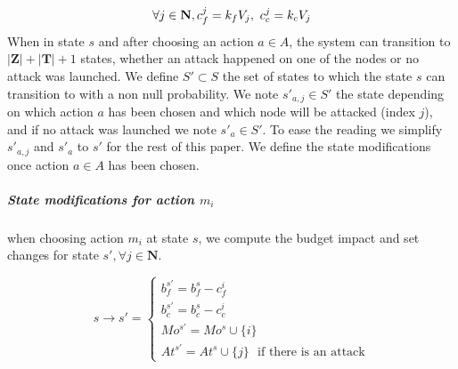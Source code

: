 \begin{equation}
\forall j \in \textbf{N}, c_f^j = k_{f}  V_j,~ c_c^j = k_{c}  V_j\\
\end{equation}
When in state $s$ and after choosing an action $a \in A$, the system can transition to $|\textbf{Z}|+|\textbf{T}| + 1 $ states, whether an attack happened on one of the nodes or no attack was launched.
We define $S' \subset S$ the set of states to which the state $s$ can transition to with a non null probability.
We note $s'_{a,j} \in S'$ the state depending on which action $a$ has been chosen and which node will be attacked (index $j$), and if no attack was launched we note $s'_a \in S'$. To ease the reading we simplify $s'_{a,j}$ and $s'_a$ to $s'$ for the rest of this paper.
We define the state modifications once action $a \in A$ has been chosen.
\\
\subparagraph*{\textbf{State modifications for action $m_i$}}
when choosing action $m_i$ at state $s$, we compute the budget impact and set changes for state $s', \forall j \in \textbf{N}$. 

\begin{equation}
  s \longrightarrow s' =\begin{cases}
    b_f^{s'} = b_f^s - c_f^i\\
    b_c^{s'} = b_c^s - c_c^i\\
    Mo^{s'} = Mo^s \cup \{i\}\\
    At^{s'} = At^s \cup \{j\} \text{~~if there is an attack}
  \end{cases}
\end{equation}

